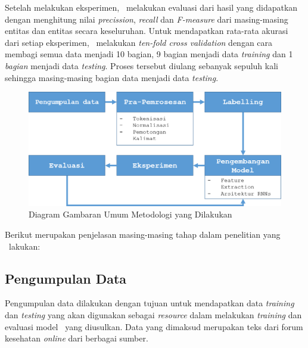 Setelah melakukan eksperimen, \saya~melakukan evaluasi dari hasil yang didapatkan dengan menghitung nilai \textit{precission}, \textit{recall} dan \textit{F-measure} dari masing-masing entitas dan entitas secara keseluruhan. Untuk mendapatkan rata-rata akurasi dari setiap eksperimen, \saya~melakukan \textit{ten-fold cross validation} dengan cara membagi semua data menjadi 10 bagian, 9 bagian menjadi data \textit{training} dan 1 \textit{bagian} menjadi data \textit{testing}. Proses tersebut diulang sebanyak sepuluh kali sehingga masing-masing bagian data menjadi data \textit{testing}.
\begin{figure}
  \centering
  \includegraphics[width=\linewidth]{images/arsitektur}
  \caption{Diagram Gambaran Umum Metodologi yang Dilakukan}
  \label{fig:metodologi_penelitian}
\end{figure}

Berikut merupakan penjelasan masing-masing tahap dalam penelitian yang \saya~lakukan:
	\subsection{Pengumpulan Data}
	Pengumpulan data dilakukan dengan tujuan untuk mendapatkan data \textit{training} dan \textit{testing} yang akan digunakan sebagai \textit{resource} dalam melakukan \textit{training} dan evaluasi model \mer~yang diusulkan. Data yang dimaksud merupakan teks dari forum kesehatan \textit{online} dari berbagai sumber.
	
